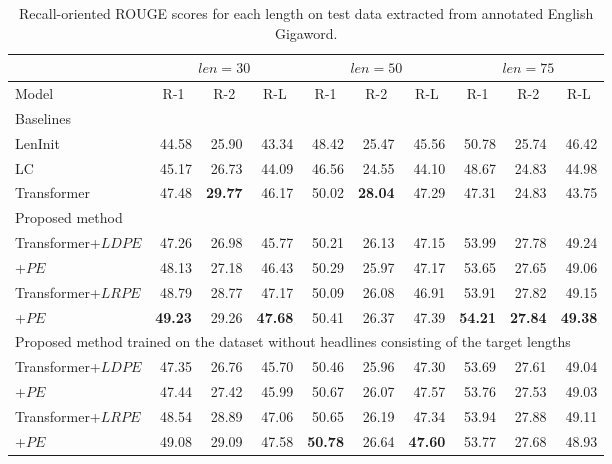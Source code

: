 \documentclass[11pt,a4paper]{article}
\begin{document}
\begin{table*}[!t]
  \centering
  \footnotesize
  \begin{tabular}{| l | r r r | r r r | r r r |} \hline
  & \multicolumn{3}{|c|}{$len = 30$} & \multicolumn{3}{c|}{$len = 50$} & \multicolumn{3}{c|}{$len = 75$} \\ \hline
  Model & \multicolumn{1}{c}{R-1} & \multicolumn{1}{c}{R-2} & \multicolumn{1}{c|}{R-L} & \multicolumn{1}{c}{R-1} & \multicolumn{1}{c}{R-2} & \multicolumn{1}{c|}{R-L} & \multicolumn{1}{c}{R-1} & \multicolumn{1}{c}{R-2} & \multicolumn{1}{c|}{R-L} \\ \hline
  \multicolumn{10}{|l|}{Baselines} \\ \hline
  LenInit& 44.58 & 25.90 & 43.34 & 48.42 & 25.47 & 45.56 & 50.78 & 25.74 & 46.42 \\
  LC & 45.17 & 26.73 & 44.09 & 46.56 & 24.55 & 44.10 & 48.67 & 24.83 & 44.98 \\
  Transformer & 47.48 & {\bf 29.77} & 46.17 & 50.02 & {\bf 28.04} & 47.29 & 47.31 & 24.83 & 43.75 \\ \hline
  \multicolumn{10}{|l|}{Proposed method} \\ \hline
  Transformer+$LDPE$ & 47.26 & 26.98 & 45.77 & 50.21 & 26.13 & 47.15 & 53.99 & 27.78 & 49.24 \\
  +$PE$ & 48.13 & 27.18 & 46.43 & 50.29 & 25.97 & 47.17 & 53.65 & 27.65 & 49.06 \\
  Transformer+$LRPE$ & 48.79 & 28.77 & 47.17 & 50.09 & 26.08 & 46.91 & 53.91 & 27.82 & 49.15 \\
  +$PE$ & {\bf 49.23} & 29.26 & {\bf 47.68} & 50.41 & 26.37 & 47.39 & {\bf 54.21} & {\bf 27.84} & {\bf 49.38} \\ \hline
  \multicolumn{10}{|l|}{Proposed method trained on the dataset without headlines consisting of the target lengths} \\ \hline
  Transformer+$LDPE$ & 47.35 & 26.76 & 45.70 & 50.46 & 25.96 & 47.30 & 53.69 & 27.61 & 49.04 \\
  +$PE$ & 47.44 & 27.42 & 45.99 & 50.67 & 26.07 & 47.57 & 53.76 & 27.53 & 49.03 \\
  Transformer+$LRPE$ & 48.54 & 28.89 & 47.06 & 50.65 & 26.19 & 47.34 & 53.94 & 27.88 & 49.11 \\
  +$PE$ & 49.08 & 29.09 & 47.58 & {\bf 50.78} & 26.64 & {\bf 47.60} & 53.77 & 27.68 & 48.93 \\ \hline
  \end{tabular}
  \caption{Recall-oriented ROUGE scores for each length on test data extracted from annotated English Gigaword.\label{tab:engiga_result}}
\end{table*}
\end{document}
